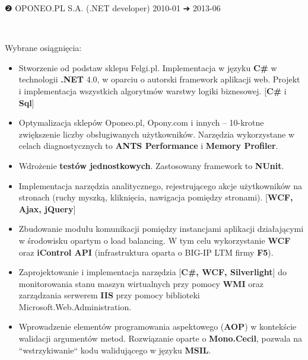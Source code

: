 \documentclass[a4paper,11pt]{article}
\newcommand{\cvEnuItemBox}[1]
{%
	\hspace{26pt}\parbox{.93\textwidth}{#1}
}
\newcommand{\cvSectionEntry}[1]
{%
	\vspace{-1pt}\noindent\setlength{\fboxsep}{0pt}\setlength{\fboxrule}{0pt}%
	\colorbox{bg}
	{%
		\color{fg}%
		\begin{minipage}[t]{\textwidth}
			#1 %
		\end{minipage}%
	}%
}
\newcommand{\cvSectionEntryHeader}[4]
{%
	\vspace{8pt}\hspace{26pt}\parbox{.93\textwidth}
	{%
		\fontsize{13pt}{1em}\selectfont #1 \hspace{2pt} #2 \hfill #3 {\segoesym ➔} #4 %
	}\\
}
\newcommand{\cvSectionEntryBody}[2]
{%
	\cvEnuItemBox{\hspace{27pt}#1#2}
}
\begin{document}
\pagebreak\vspace*{-11pt}

\cvSectionEntry
{
	\cvSectionEntryHeader{❷}{OPONEO.PL S.A. (.NET developer)}{2010-01}{2013-06}

	\cvSectionEntryBody{Wybrane osiągnięcia:}
	{
		\begin{itemize}
			\setlength\itemsep{-1pt}
			\item Stworzenie od podstaw sklepu Felgi.pl. Implementacja w języku \textbf{C\#} w technologii \textbf{.NET} 4.0, w oparciu o autorski framework aplikacji web. Projekt i implementacja wszystkich algorytmów warstwy logiki biznesowej. [\textbf{C\#} i \textbf{Sql}]
			\item Optymalizacja sklepów Oponeo.pl, Opony.com i innych -- 10-krotne zwiększenie liczby obsługiwanych użytkowników. Narzędzia wykorzystane w celach diagnostycznych to \textbf{ANTS Performance} i \textbf{Memory Profiler}.
			\item Wdrożenie \textbf{testów jednostkowych}. Zastosowany framework to \textbf{NUnit}.
			\item Implementacja narzędzia analitycznego, rejestrującego akcje użytkowników na stronach (ruchy myszką, kliknięcia, nawigacja pomiędzy stronami). [\textbf{WCF, Ajax, jQuery}]
			\item Zbudowanie modułu komunikacji pomiędzy instancjami aplikacji działającymi w środowisku opartym o load balancing. W tym celu wykorzystanie \textbf{WCF} oraz \textbf{iControl API} (infrastruktura oparta o BIG-IP LTM firmy \textbf{F5}).
			\item Zaprojektowanie i implementacja narzędzia [\textbf{C\#, WCF, Silverlight}] do monitorowania stanu maszyn wirtualnych przy pomocy \textbf{WMI} oraz zarządzania serwerem \textbf{IIS} przy pomocy biblioteki Microsoft.Web.Administration.
			\item Wprowadzenie elementów programowania aspektowego (\textbf{AOP}) w kontekście walidacji argumentów metod. Rozwiązanie oparte o \textbf{Mono.Cecil}, pozwala na ``wstrzykiwanie`` kodu walidującego w języku \textbf{MSIL}.
		\end{itemize}
	}
}
\end{document}
